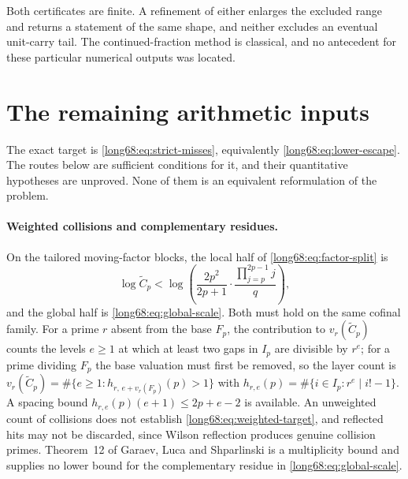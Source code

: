 \documentclass[11pt]{article}
\begin{document}
Both certificates are finite.  A refinement of either enlarges the excluded
range and returns a statement of the same shape, and neither excludes an
eventual unit-carry tail.  The continued-fraction method is classical, and no
antecedent for these particular numerical outputs was located.

\section{The remaining arithmetic inputs}\label{long68:sec:open}

The exact target is \eqref{long68:eq:strict-misses}, equivalently
\eqref{long68:eq:lower-escape}.  The routes below are sufficient conditions for it,
and their quantitative hypotheses are unproved.  None of them is an
equivalent reformulation of the problem.

\paragraph{Weighted collisions and complementary residues.}
On the tailored moving-factor blocks, the local half of
\eqref{long68:eq:factor-split} is
\begin{equation}\label{long68:eq:weighted-target}
 \log\widetilde C_p
 <\log\left(\frac{2p^2}{2p+1}\cdot
       \frac{\prod_{j=p}^{2p-1}j}{q}\right),
\end{equation}
and the global half is \eqref{long68:eq:global-scale}.  Both must hold on the same
cofinal family.  For a prime $r$ absent from the base $F_p$, the contribution
to $v_r(\widetilde C_p)$ counts the levels $e\ge1$ at which at least two gaps
in $I_p$ are divisible by $r^e$; for a prime dividing $F_p$ the base
valuation must first be removed, so the layer count is
$v_r(\widetilde C_p)=\#\{e\ge1:h_{r,\,e+v_r(F_p)}(p)>1\}$ with
$h_{r,e}(p)=\#\{i\in I_p:r^e\mid i!-1\}$.  A spacing bound
$h_{r,e}(p)(e+1)\le2p+e-2$ is available.  An unweighted count of collisions
does not establish \eqref{long68:eq:weighted-target}, and reflected hits may not be
discarded, since Wilson reflection produces genuine collision primes.
Theorem~12 of Garaev, Luca and Shparlinski
\cite[arXiv v1, Thm.~12, p.~16]{garaev-luca-shparlinski} is a multiplicity
bound and supplies no lower bound for the complementary residue in
\eqref{long68:eq:global-scale}.
\end{document}
